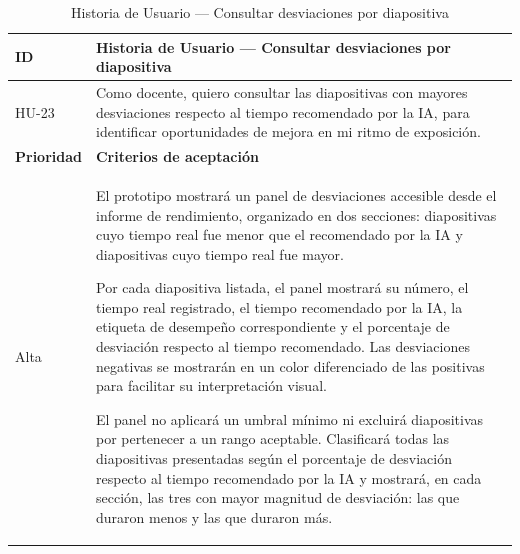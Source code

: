 \documentclass[11pt]{article}
\newcommand{\ttstyle}{%
  \small
  \setlength{\tabcolsep}{6pt}%
  \renewcommand{\arraystretch}{1.25}%
  \arrayrulecolor{azulprofundo}%
}
\newcommand{\hairrule}{%
  \arrayrulecolor{azulregla}\midrule[0.3pt]\arrayrulecolor{azulprofundo}%
}
\begin{document}
\begin{table}[H]
    \centering
    \renewcommand{\arraystretch}{1.2}
    \ttstyle
    \begin{tabular}{p{2.5cm}p{11cm}}
        \toprule
        \textbf{ID} & \textbf{Historia de Usuario --- Consultar desviaciones por diapositiva} \\
        \midrule
        HU-23 & Como docente, quiero consultar las diapositivas con mayores desviaciones respecto al tiempo recomendado por la IA, para identificar oportunidades de mejora en mi ritmo de exposición. \\
        \hairrule
        \textbf{Prioridad} & \textbf{Criterios de aceptación} \\
        \hairrule
        Alta & El prototipo mostrará un panel de desviaciones accesible desde el informe de rendimiento, organizado en dos secciones: diapositivas cuyo tiempo real fue menor que el recomendado por la IA y diapositivas cuyo tiempo real fue mayor.

        Por cada diapositiva listada, el panel mostrará su número, el tiempo real registrado, el tiempo recomendado por la IA, la etiqueta de desempeño correspondiente y el porcentaje de desviación respecto al tiempo recomendado. Las desviaciones negativas se mostrarán en un color diferenciado de las positivas para facilitar su interpretación visual.

        El panel no aplicará un umbral mínimo ni excluirá diapositivas por pertenecer a un rango aceptable. Clasificará todas las diapositivas presentadas según el porcentaje de desviación respecto al tiempo recomendado por la IA y mostrará, en cada sección, las tres con mayor magnitud de desviación: las que duraron menos y las que duraron más. \\
        \bottomrule
    \end{tabular}
    \caption{Historia de Usuario --- Consultar desviaciones por diapositiva}
    \label{tab:hu-consultar-desviaciones-diapositiva}
\end{table}
\end{document}
